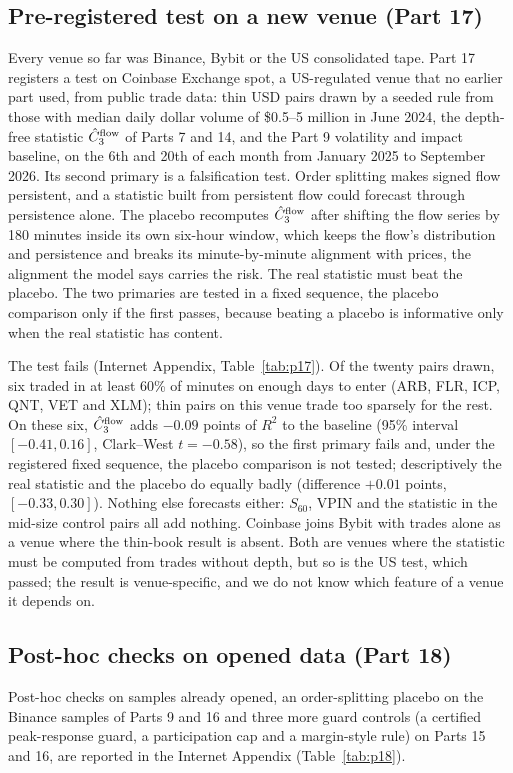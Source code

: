 \documentclass[12pt]{article}
\theoremstyle{definition}
\theoremstyle{remark}
\begin{document}
\subsection{Pre-registered test on a new venue (Part 17)}\label{sec:p17}
Every venue so far was Binance, Bybit or the US consolidated tape. Part 17 registers a test on Coinbase Exchange spot, a US-regulated venue that no earlier part used, from public trade data: thin USD pairs drawn by a seeded rule from those with median daily dollar volume of \$0.5--5 million in June 2024, the depth-free statistic $\hat C_3^{\rm flow}$ of Parts 7 and 14, and the Part 9 volatility and impact baseline, on the 6th and 20th of each month from January 2025 to September 2026. Its second primary is a falsification test. Order splitting makes signed flow persistent, and a statistic built from persistent flow could forecast through persistence alone. The placebo recomputes $\hat C_3^{\rm flow}$ after shifting the flow series by 180 minutes inside its own six-hour window, which keeps the flow's distribution and persistence and breaks its minute-by-minute alignment with prices, the alignment the model says carries the risk. The real statistic must beat the placebo. The two primaries are tested in a fixed sequence, the placebo comparison only if the first passes, because beating a placebo is informative only when the real statistic has content.

The test fails (Internet Appendix, Table~\ref{tab:p17}). Of the twenty pairs drawn, six traded in at least 60\% of minutes on enough days to enter (ARB, FLR, ICP, QNT, VET and XLM); thin pairs on this venue trade too sparsely for the rest. On these six, $\hat C_3^{\rm flow}$ adds $-0.09$ points of $R^2$ to the baseline (95\% interval $[-0.41,0.16]$, Clark--West $t=-0.58$), so the first primary fails and, under the registered fixed sequence, the placebo comparison is not tested; descriptively the real statistic and the placebo do equally badly (difference $+0.01$ points, $[-0.33,0.30]$). Nothing else forecasts either: $S_{60}$, VPIN and the statistic in the mid-size control pairs all add nothing. Coinbase joins Bybit with trades alone as a venue where the thin-book result is absent. Both are venues where the statistic must be computed from trades without depth, but so is the US test, which passed; the result is venue-specific, and we do not know which feature of a venue it depends on.



\subsection{Post-hoc checks on opened data (Part 18)}\label{sec:p18}
Post-hoc checks on samples already opened, an order-splitting placebo on the Binance samples of Parts 9 and 16 and three more guard controls (a certified peak-response guard, a participation cap and a margin-style rule) on Parts 15 and 16, are reported in the Internet Appendix (Table~\ref{tab:p18}).
\end{document}
